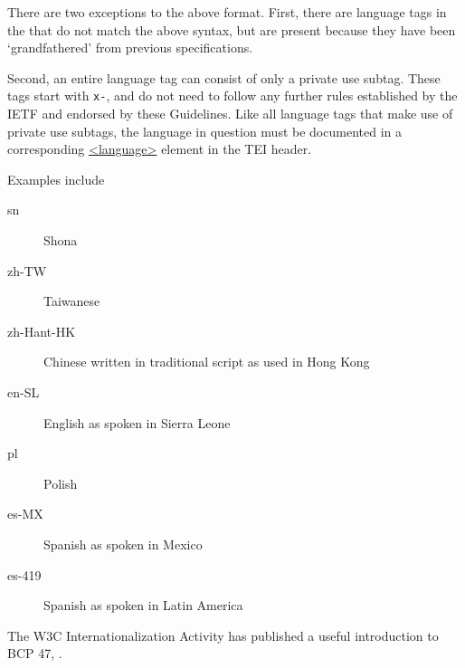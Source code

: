 \begin{reflist}
There are two exceptions to the above format. First, there are language tags in the  that do not match the above syntax, but are present because they have been ‘grandfathered’ from previous specifications.\par
Second, an entire language tag can consist of only a private use subtag. These tags start with \texttt{x-}, and do not need to follow any further rules established by the IETF and endorsed by these Guidelines. Like all language tags that make use of private use subtags, the language in question must be documented in a corresponding \hyperref[TEI.language]{<language>} element in the TEI header.\par
Examples include \begin{description}

\item[{sn}]Shona
\item[{zh-TW}]Taiwanese
\item[{zh-Hant-HK}]Chinese written in traditional script as used in Hong Kong
\item[{en-SL}]English as spoken in Sierra Leone
\item[{pl}]Polish
\item[{es-MX}]Spanish as spoken in Mexico
\item[{es-419}]Spanish as spoken in Latin America
\end{description} \par
The W3C Internationalization Activity has published a useful introduction to BCP 47, .
\end{reflist}  
